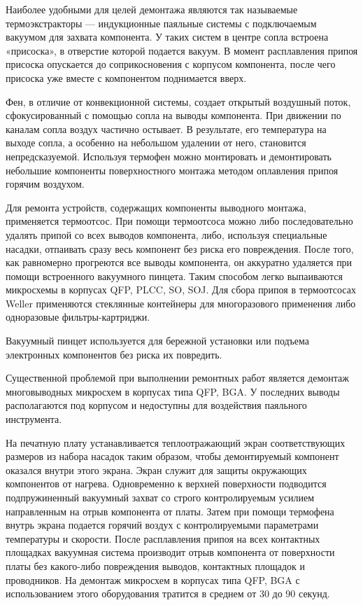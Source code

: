 \documentclass[unicode, 12pt, a4paper, oneside]{article}
\begin{document}
Наиболее удобными для целей демонтажа являются так называемые термоэкстракторы — индукционные паяльные системы с подключаемым вакуумом для захвата компонента. У таких систем в центре сопла встроена «присоска», в отверстие которой подается вакуум. В момент расплавления припоя присоска опускается до соприкосновения с корпусом компонента, после чего присоска уже вместе с компонентом поднимается вверх.

Фен, в отличие от конвекционной системы, создает открытый воздушный поток, сфокусированный с помощью сопла на выводы компонента. При движении по каналам сопла воздух частично остывает. В результате, его температура на выходе сопла, а особенно на небольшом удалении от него, становится непредсказуемой. Используя термофен можно монтировать и демонтировать небольшие компоненты поверхностного монтажа методом оплавления припоя горячим воздухом.

Для ремонта устройств, содержащих компоненты выводного монтажа, применяется термоотсос. При помощи термоотсоса можно либо последовательно удалять припой со всех выводов компонента, либо, используя специальные насадки, отпаивать сразу весь компонент без риска его повреждения. После того, как равномерно прогреются все выводы компонента, он аккуратно удаляется при помощи встроенного вакуумного пинцета. Таким способом легко выпаиваются микросхемы в корпусах QFP, PLCC, SO, SOJ. Для сбора припоя в термоотсосах Weller применяются стеклянные контейнеры для многоразового применения либо одноразовые фильтры-картриджи.

Вакуумный пинцет используется для бережной установки или подъема электронных компонентов без риска их повредить.

Существенной проблемой при выполнении ремонтных работ является демонтаж многовыводных микросхем в корпусах типа QFP, BGA. У последних выводы располагаются под корпусом и недоступны для воздействия паяльного инструмента.

На печатную плату устанавливается теплоотражающий экран соответствующих размеров из набора насадок таким образом, чтобы демонтируемый компонент оказался внутри этого экрана. Экран служит для защиты окружающих компонентов от нагрева. Одновременно к верхней поверхности подводится подпружиненный вакуумный захват со строго контролируемым усилием направленным на отрыв компонента от платы. Затем при помощи термофена внутрь экрана подается горячий воздух с контролируемыми параметрами температуры и скорости. После расплавления припоя на всех контактных площадках вакуумная система производит отрыв компонента от поверхности платы без какого-либо повреждения выводов, контактных площадок и проводников. На демонтаж микросхем в корпусах типа QFP, BGA с использованием этого оборудования тратится в среднем от 30 до 90 секунд.
\end{document}
